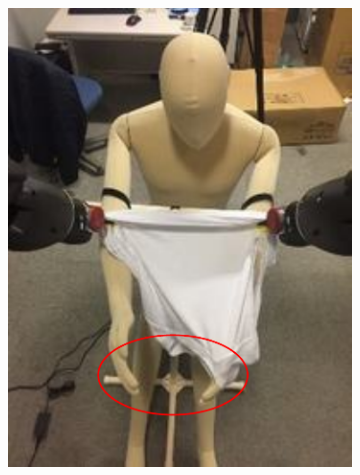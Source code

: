 \documentclass[sigconf]{acmart}
\begin{document}
\begin{figure}
\begin{subfigure}{.4\linewidth}
		\includegraphics[width=.98\linewidth]{failure_scenario_2}
	\end{subfigure}
	\begin{subfigure}{.4\linewidth}

\end{subfigure}
\end{figure}
\end{document}
